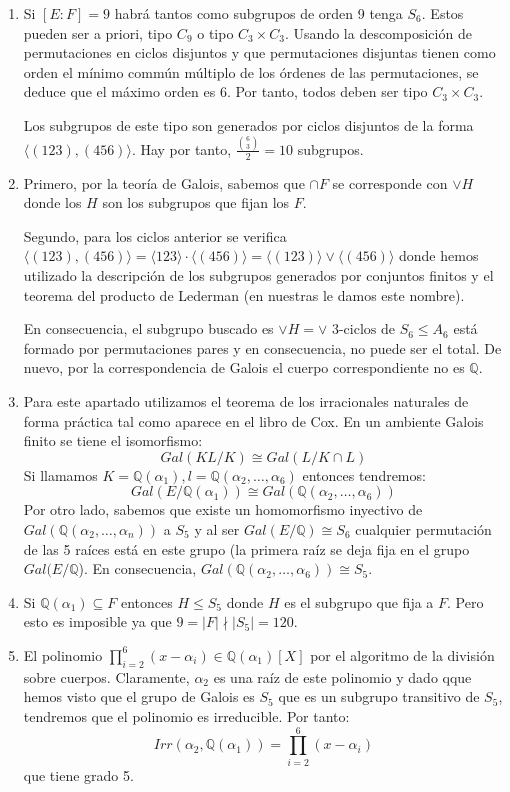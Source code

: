 \documentclass{article}
\theoremstyle{theorem-style}  %
\theoremstyle{definition-style}
\theoremstyle{example-style}
\begin{document}
\begin{enumerate}
\item Si $[E:F] = 9$ habrá tantos como subgrupos de orden 9 tenga $S_6$. Estos pueden ser a priori, tipo $C_9$ o tipo $C_3 \times C_3$. Usando la descomposición de permutaciones en ciclos disjuntos y que permutaciones disjuntas tienen como orden el mínimo commún múltiplo de los órdenes de las permutaciones, se deduce que el máximo orden es 6. Por tanto, todos deben ser tipo $C_3 \times C_3$. 

Los subgrupos de este tipo son generados por ciclos disjuntos de la forma $\langle (123),(456) \rangle$. Hay por tanto, $\frac{\binom{6}{3}}{2} = 10$ subgrupos. 

\item Primero, por la teoría de Galois, sabemos que $\cap F$ se corresponde con $\lor H$ donde los $H$ son los subgrupos que fijan los $F$. 

Segundo, para los ciclos anterior se verifica $\langle (123),(456) \rangle = \langle 123 \rangle \cdot \langle (456) \rangle = \langle (123) \rangle \lor \langle (456) \rangle$ donde hemos utilizado la descripción de los subgrupos generados por conjuntos finitos y el teorema del producto de Lederman (en nuestras le damos este nombre). 

En consecuencia, el subgrupo buscado es $\lor H = \lor \text{ 3-ciclos de } S_6 \le A_6$ está formado por permutaciones pares y en consecuencia, no puede ser el total. De nuevo, por la correspondencia de Galois el cuerpo correspondiente no es $\mathbb{Q}$.

\item Para este apartado utilizamos el teorema de los irracionales naturales de forma práctica tal como aparece en el libro de Cox. En un ambiente Galois finito se tiene el isomorfismo: $$Gal(KL/K) \cong Gal(L/K \cap L)$$ Si llamamos $K = \mathbb{Q}(\alpha_1), l =  \mathbb{Q}(\alpha_2,\ldots,\alpha_6)$ entonces tendremos:  $$Gal(E/\mathbb{Q}(\alpha_1)) \cong Gal(\mathbb{Q}(\alpha_2,\ldots,\alpha_6))$$ Por otro lado, sabemos que existe un homomorfismo inyectivo de $Gal(\mathbb{Q}(\alpha_2,\ldots,\alpha_n))$ a $S_5$ y al ser $Gal(E/\mathbb{Q}) \cong S_6$ cualquier permutación de las 5 raíces está en este grupo (la primera raíz se deja fija en el grupo $Gal(E/\mathbb{Q}$). En consecuencia, $Gal(\mathbb{Q}(\alpha_2,\ldots,\alpha_6)) \cong S_5$. 

\item Si $\mathbb{Q}(\alpha_1) \subseteq F$ entonces $H \le S_5$ donde $H$ es el subgrupo que fija a $F$. Pero esto es imposible ya que $9 = |F| \nmid |S_5| = 120$. 

\item El polinomio $\prod_{i = 2}^6 (x-\alpha_i) \in \mathbb{Q}(\alpha_1)[X]$ por el algoritmo de la división sobre cuerpos. Claramente, $\alpha_2$ es una raíz de este polinomio y dado qque hemos visto que el grupo de Galois es $S_5$ que es un subgrupo transitivo de $S_5$, tendremos que el polinomio es irreducible. Por tanto: $$Irr(\alpha_2,\mathbb{Q}(\alpha_1)) = \prod_{i = 2}^6 (x-\alpha_i)$$ que tiene grado 5. 
\end{enumerate}



\printbibliography
\end{document}
